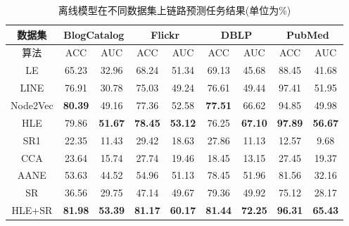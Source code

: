 \begin{table}[]
	\centering
	\caption{离线模型在不同数据集上链路预测任务结果(单位为\%)}
	\label{tab:off_link_prediction}
	\begin{tabular}{|c||c|c||c|c||c|c||c|c|}
		\hline
		数据集      & \multicolumn{2}{c||}{BlogCatalog} & \multicolumn{2}{c||}{Flickr}     & \multicolumn{2}{c||}{DBLP}   & \multicolumn{2}{c|}{PubMed}     \\ \hline\hline
		算法       & ACC             & AUC            & ACC            & AUC            & ACC            & AUC            & ACC            & AUC            \\ \hline
		LE       & 65.23           & 32.96          & 68.24          & 51.34          & 69.13          & 45.68          & 88.45          & 41.68          \\ \hline
		LINE     & 76.91           & 30.78          & 75.03          & 49.24          & 76.61          & 49.44          & 97.41          & 51.95 \\ \hline
		Node2Vec & \textbf{80.39}  & 49.16          & 77.36          & 52.58          & \textbf{77.51} & 66.62          & 94.85          & 49.98          \\ \hline
		HLE      & 79.86           & \textbf{51.67} & \textbf{78.45} & \textbf{53.12} & 76.25          & \textbf{67.10} & \textbf{97.89} & \textbf{56.67}          \\ \hline\hline
		SR1      & 22.35           & 11.43          & 29.42          & 18.63          & 27.86          & 11.13          & 12.57          & 9.68           \\ \hline\hline
		CCA      & 23.64           & 15.74          & 27.74          & 19.46          & 18.45          & 13.15          & 27.45          & 19.37          \\ \hline
		AANE     & 53.63           & 44.52          & 54.96          & 51.13 & 78.45          & 51.96          & 81.56 & 32.16          \\ \hline
		SR       & 36.56           & 29.75          & 47.14          & 49.67          & 79.36          & 49.92          & 75.12          & 28.17          \\ \hline
		HLE+SR   & \textbf{81.98}  & \textbf{53.39} & \textbf{81.17} & \textbf{60.17}          & \textbf{81.44} & \textbf{72.25} & \textbf{96.31}          & \textbf{65.43} \\ \hline
	\end{tabular}
\end{table}

